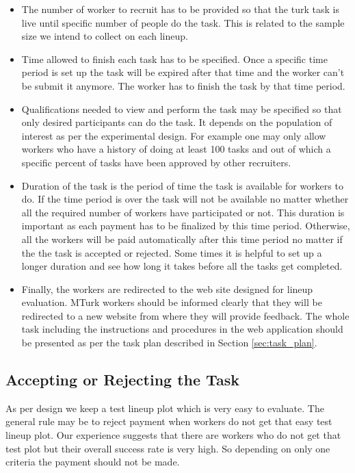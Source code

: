\documentclass[11pt]{article}
\begin{document}
\begin{itemize}

\item The number of worker to recruit has to be provided so that the turk task is live until specific number of people do the task. This is related to the sample size we intend to collect on each lineup. 

\item Time allowed to finish each task has to be specified. Once a specific time period is set up the task will be expired after that time and the worker can't be submit it anymore. The worker has to finish the task by that time period. 

\item Qualifications needed to view and perform the task may be specified so that only desired participants can do the task. It depends on the population of interest as per the experimental design. For example one may only allow workers who have a history of doing at least 100 tasks and out of which a specific percent of tasks have been approved by other recruiters. 

\item Duration of the task is the period of time the task is available for workers to do. If the time period is over the task will not be available no matter whether all the required number of workers have participated or not. This duration is important as each payment has to be finalized by this time period. Otherwise, all the workers will be paid automatically after this time period no matter if the the task is accepted or rejected. Some times it is helpful to set up a longer duration and see how long it takes before all the tasks get completed.

\item Finally, the workers are redirected to the web site designed for lineup evaluation. MTurk workers should be informed clearly that they will be redirected to a new website from where they will provide feedback. The whole task including the instructions and procedures in the web application should be presented as per the task plan described in Section \ref{sec:task_plan}.

\end{itemize}

\subsection{Accepting or Rejecting the Task} As per design we keep a test lineup plot which is very easy to evaluate. The general rule may be to reject payment when workers do not get that easy test lineup plot. Our experience suggests that there are workers who do not get that test plot but their overall success rate is very high. So depending on only one criteria the payment should not be made. 
\end{document}
